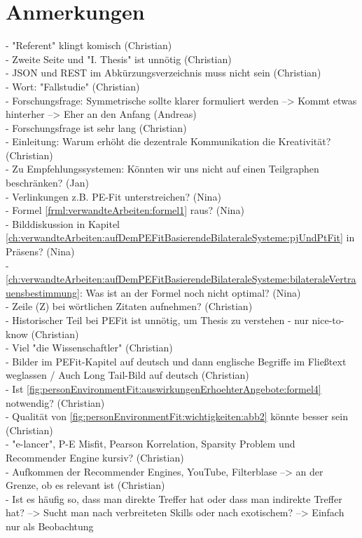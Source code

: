 \section{Anmerkungen}
\label{ch:fazit:anmerkungen}
- "Referent" klingt komisch (Christian)\\
- Zweite Seite und "I. Thesis" ist unnötig (Christian)\\
- JSON und REST im Abkürzungsverzeichnis muss nicht sein (Christian)\\
- Wort: "Fallstudie" (Christian)\\
- Forschungsfrage: Symmetrische sollte klarer formuliert werden --> Kommt etwas hinterher --> Eher an den Anfang (Andreas)\\
- Forschungsfrage ist sehr lang (Christian)\\
- Einleitung: Warum erhöht die dezentrale Kommunikation die Kreativität? (Christian)\\
- Zu Empfehlungssystemen: Könnten wir uns nicht auf einen Teilgraphen beschränken? (Jan)\\
- Verlinkungen z.B. PE-Fit unterstreichen? (Nina)\\
- Formel \ref{frml:verwandteArbeiten:formel1} raus? (Nina)\\
- Bilddiskussion in Kapitel \ref{ch:verwandteArbeiten:aufDemPEFitBasierendeBilateraleSysteme:pjUndPtFit} in Präsens? (Nina)\\
- \ref{ch:verwandteArbeiten:aufDemPEFitBasierendeBilateraleSysteme:bilateraleVertrauensbestimmung}: Was ist an der Formel noch nicht optimal? (Nina)\\
- Zeile (Z) bei wörtlichen Zitaten aufnehmen? (Christian)\\
- Historischer Teil bei \ac{PEFit} ist unnötig, um Thesis zu verstehen - nur nice-to-know (Christian)\\
- Viel "die Wissenschaftler" (Christian)\\
- Bilder im \ac{PEFit}-Kapitel auf deutsch und dann englische Begriffe im Fließtext weglassen / Auch Long Tail-Bild auf deutsch (Christian)\\
- Ist \ref{fig:personEnvironmentFit:auswirkungenErhoehterAngebote:formel4} notwendig? (Christian)\\
- Qualität von \ref{fig:personEnvironmentFit:wichtigkeiten:abb2} könnte besser sein (Christian)\\
- "e-lancer", P-E Misfit, Pearson Korrelation, Sparsity Problem und Recommender Engine kursiv? (Christian)\\
- Aufkommen der Recommender Engines, YouTube, Filterblase --> an der Grenze, ob es relevant ist (Christian)\\
- Ist es häufig so, dass man direkte Treffer hat oder dass man indirekte Treffer hat? --> Sucht man nach verbreiteten Skills oder nach exotischem? --> Einfach nur als Beobachtung
